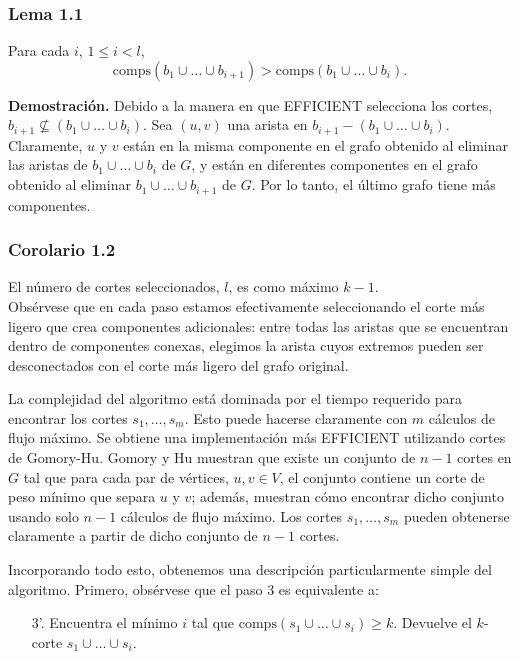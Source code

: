 \documentclass[a4paper, 12pt]{article}
\begin{document}
\subsubsection*{Lema 1.1}
Para cada $i$, $1 \leq i < l$, 
\[\text{comps}(b_1 \cup \dots \cup b_{i+1}) > \text{comps}(b_1 \cup \dots \cup b_i).\]

\textbf{Demostración.} Debido a la manera en que \textsc{EFFICIENT} selecciona los cortes, $b_{i+1} \nsubseteq (b_1 \cup \dots \cup b_i)$. Sea $(u, v)$ una arista en $b_{i+1} - (b_1 \cup \dots \cup b_i)$. Claramente, $u$ y $v$ están en la misma componente en el grafo obtenido al eliminar las aristas de $b_1 \cup \dots \cup b_i$ de $G$, y están en diferentes componentes en el grafo obtenido al eliminar $b_1 \cup \dots \cup b_{i+1}$ de $G$. Por lo tanto, el último grafo tiene más componentes.

\subsubsection*{Corolario 1.2}
El número de cortes seleccionados, $l$, es como máximo $k - 1$.\\

Obsérvese que en cada paso estamos efectivamente seleccionando el corte más ligero que crea componentes adicionales: entre todas las aristas que se encuentran dentro de componentes conexas, elegimos la arista cuyos extremos pueden ser desconectados con el corte más ligero del grafo original.

La complejidad del algoritmo está dominada por el tiempo requerido para encontrar los cortes $s_1, \dots, s_m$. Esto puede hacerse claramente con $m$ cálculos de flujo máximo. Se obtiene una implementación más EFFICIENT utilizando cortes de Gomory-Hu. Gomory y Hu \cite{GH} muestran que existe un conjunto de $n - 1$ cortes en $G$ tal que para cada par de vértices, $u, v \in V$, el conjunto contiene un corte de peso mínimo que separa $u$ y $v$; además, muestran cómo encontrar dicho conjunto usando solo $n - 1$ cálculos de flujo máximo. Los cortes $s_1, \dots, s_m$ pueden obtenerse claramente a partir de dicho conjunto de $n - 1$ cortes.

Incorporando todo esto, obtenemos una descripción particularmente simple del algoritmo. Primero, obsérvese que el paso 3 es equivalente a:

\begin{enumerate}
    \item[3'.] Encuentra el mínimo $i$ tal que $\text{comps}(s_1 \cup \dots \cup s_i) \geq k$. Devuelve el $k$-corte $s_1 \cup \dots \cup s_i$.
\end{enumerate}
\end{document}
